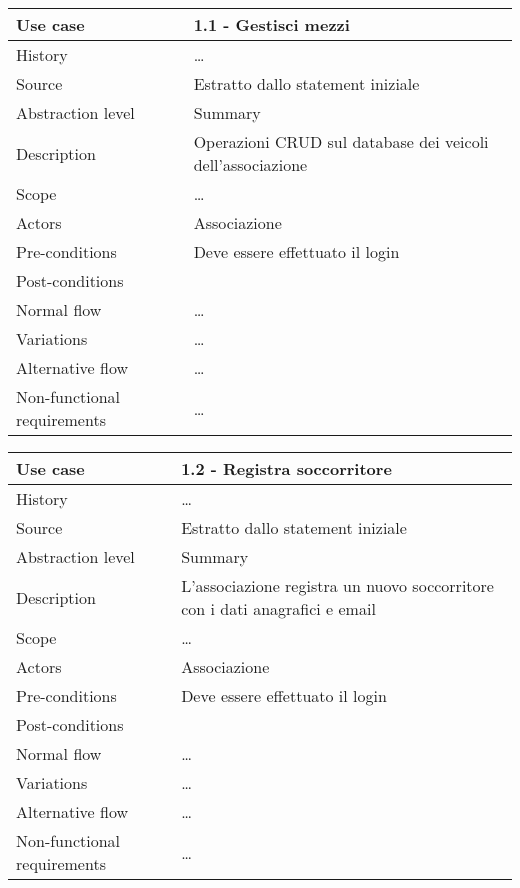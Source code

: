 \documentclass{article}
\begin{document}

    \begin{table}
        \begin{tabularx}{\textwidth}{l|X}
            Use case & 1.1 - Gestisci mezzi \\
            \hline
            History & \dots \\
            Source & Estratto dallo statement iniziale\\
            Abstraction level & Summary\\
            Description & Operazioni CRUD sul database dei veicoli dell’associazione \\
            Scope & \dots\\
            Actors & Associazione\\
            Pre-conditions & Deve essere effettuato il login\\
            Post-conditions & \\
            Normal flow & \dots \\
            Variations & \dots \\
            Alternative flow & \dots \\
            Non-functional requirements & \dots
        \end{tabularx}
        \label{tab:usecase1.1}
    \end{table}

    \begin{table}
        \begin{tabularx}{\textwidth}{l|X}
            Use case & 1.2 - Registra soccorritore \\
            \hline
            History & \dots \\
            Source & Estratto dallo statement iniziale\\
            Abstraction level & Summary\\
            Description & L’associazione registra un nuovo soccorritore con i dati anagrafici e email\\
            Scope & \dots\\
            Actors & Associazione\\
            Pre-conditions & Deve essere effettuato il login\\
            Post-conditions & \\
            Normal flow & \dots \\
            Variations & \dots \\
            Alternative flow & \dots \\
            Non-functional requirements & \dots
        \end{tabularx}
        \label{tab:usecase1.2}
    \end{table}
\end{document}
